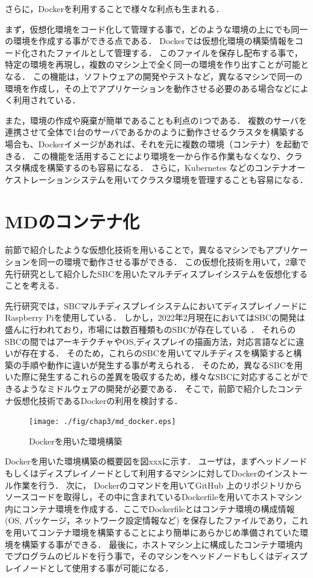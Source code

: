 さらに，Dockerを利用することで様々な利点も生まれる．

まず，仮想化環境をコード化して管理する事で，どのような環境の上にでも同一の環境を作成する事ができる点である．
Dockerでは仮想化環境の構築情報をコード化されたファイルとして管理する．
このファイルを保存し配布する事で，特定の環境を再現し，複数のマシン上で全く同一の環境を作り出すことが可能となる．
この機能は，ソフトウェアの開発やテストなど，異なるマシンで同一の環境を作成し，その上でアプリケーションを動作させる必要のある場合などによく利用されている．

また，環境の作成や廃棄が簡単であることも利点の1つである．
複数のサーバを連携させて全体で1台のサーバであるかのように動作させるクラスタを構築する場合も、Dockerイメージがあれば、それを元に複数の環境（コンテナ）を起動できる．
この機能を活用することにより環境を一から作る作業もなくなり、クラスタ構成を構築するのも容易になる．
さらに，Kubernetes \cite{k8s}などのコンテナオーケストレーションシステムを用いてクラスタ環境を管理することも容易になる．



\section{MDのコンテナ化}
前節で紹介したような仮想化技術を用いることで，異なるマシンでもアプリケーションを同一の環境で動作させる事ができる．
この仮想化技術を用いて，2章で先行研究として紹介したSBCを用いたマルチディスプレイシステムを仮想化することを考える．

先行研究では，SBCマルチディスプレイシステムにおいてディスプレイノードにRaspberry Piを使用している．
しかし，2022年2月現在においてはSBCの開発は盛んに行われており，市場には数百種類ものSBCが存在している \cite{hackerbords}．
それらのSBCの間ではアーキテクチャやOS,ディスプレイの描画方法，対応言語などに違いが存在する．
そのため，これらのSBCを用いてマルチディスを構築すると構築の手順や動作に違いが発生する事が考えられる．
そのため，異なるSBCを用いた際に発生するこれらの差異を吸収するため，様々なSBCに対応することができるようなミドルウェアの開発が必要である．
そこで，前節で紹介したコンテナ仮想化技術であるDockerの利用を検討する．

\begin{figure}[H]
    \hspace*{\fill}
    \texttt{[image: ./fig/chap3/md\_docker.eps]}
    \hspace*{\fill}
    \caption{Dockerを用いた環境構築}
\end{figure}

Dockerを用いた環境構築の概要図を図xxxに示す．
ユーザは，まずヘッドノードもしくはディスプレイノードとして利用するマシンに対してDockerのインストール作業を行う．
次に， Dockerのコマンドを用いてGitHub \cite{github}上のリポジトリからソースコードを取得し，その中に含まれているDockerfileを用いてホストマシン内にコンテナ環境を作成する．ここでDockerfileとはコンテナ環境の構成情報 (OS, パッケージ，ネットワーク設定情報など) を保存したファイルであり，これを用いてコンテナ環境を構築することにより簡単にあらかじめ準備されていた環境を構築する事ができる．
最後に，ホストマシン上に構成したコンテナ環境内でプログラムのビルドを行う事で，そのマシンをヘッドノードもしくはディスプレイノードとして使用する事が可能になる．

